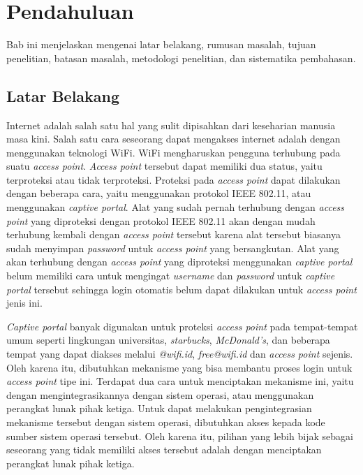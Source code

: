 \chapter{Pendahuluan}
\label{chap:pendahuluan}

Bab ini menjelaskan mengenai latar belakang, rumusan masalah, tujuan penelitian, batasan masalah, metodologi penelitian, dan sistematika pembahasan.



\section{Latar Belakang}
\label{sec:latar_belakang}

Internet adalah salah satu hal yang sulit dipisahkan dari keseharian manusia masa kini. Salah satu cara seseorang dapat mengakses internet adalah dengan menggunakan teknologi WiFi. WiFi mengharuskan pengguna terhubung pada suatu \textit{access point}. \textit{Access point} tersebut dapat memiliki dua status, yaitu terproteksi atau tidak terproteksi. Proteksi pada \textit{access point} dapat dilakukan dengan beberapa cara, yaitu menggunakan protokol IEEE 802.11\cite{IEEE80211:2011}, atau menggunakan \textit{captive portal}. Alat yang sudah pernah terhubung dengan \textit{access point} yang diproteksi dengan protokol IEEE 802.11 akan dengan mudah terhubung kembali dengan \textit{access point} tersebut karena alat tersebut biasanya sudah menyimpan \textit{password} untuk \textit{access point} yang bersangkutan. Alat yang akan terhubung dengan \textit{access point} yang diproteksi menggunakan \textit{captive portal} belum memiliki cara untuk mengingat \textit{username} dan \textit{password} untuk \textit{captive portal} tersebut sehingga login otomatis belum dapat dilakukan untuk \textit{access point} jenis ini.

\textit{Captive portal} banyak digunakan untuk proteksi \textit{access point} pada tempat-tempat umum seperti lingkungan universitas, \textit{starbucks}, \textit{McDonald's}, dan beberapa tempat yang dapat diakses melalui \textit{@wifi.id}, \textit{free@wifi.id} dan \textit{access point} sejenis. Oleh karena itu, dibutuhkan mekanisme yang bisa membantu proses login untuk \textit{access point} tipe ini. Terdapat dua cara untuk menciptakan mekanisme ini, yaitu dengan mengintegrasikannya dengan sistem operasi, atau menggunakan perangkat lunak pihak ketiga. Untuk dapat melakukan pengintegrasian mekanisme tersebut dengan sistem operasi, dibutuhkan akses kepada kode sumber sistem operasi tersebut. Oleh karena itu, pilihan yang lebih bijak sebagai seseorang yang tidak memiliki akses tersebut adalah dengan menciptakan perangkat lunak pihak ketiga.

